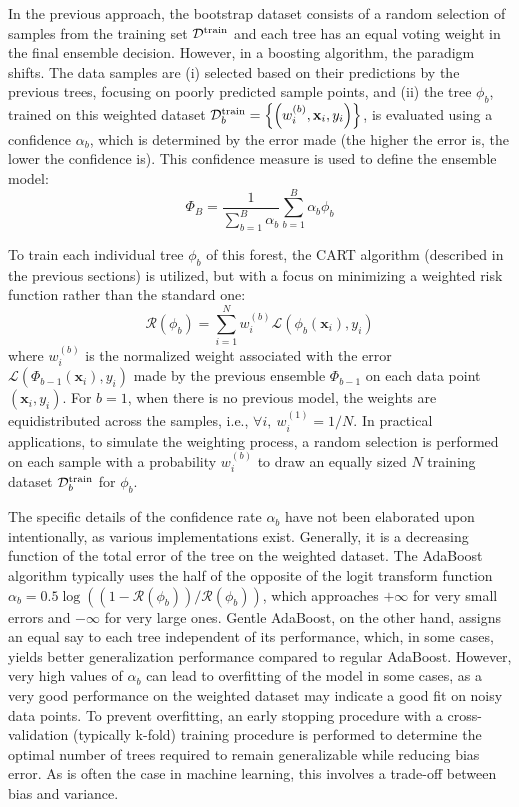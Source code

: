 \documentclass[main]{subfiles}
\begin{document}
In the previous approach, the bootstrap dataset consists of a random selection of samples from the training set $\mathcal{D}^{\text{train}}$ and each tree has an equal voting weight in the final ensemble decision. However, in a boosting algorithm,\autocite{drucker1997improving} the paradigm shifts. The data samples are (i) selected based on their predictions by the previous trees, focusing on poorly predicted sample points, and (ii) the tree $\phi_b$, trained on this weighted dataset $\mathcal{D}^{\text{train}}_b=\left\{\left(w_i^{(b)},\mathbf{x}_i,y_i\right)\right\}$, is evaluated using a confidence $\alpha_b$, which is determined by the error made (the higher the error is, the lower the confidence is). This confidence measure is used to define the ensemble model:
\begin{equation}
  \Phi_B = \frac{1}{\sum_{b=1}^{B} \alpha_b}\sum_{b=1}^{B} \alpha_b\phi_b
\end{equation}

To train each individual tree $\phi_b$ of this forest, the CART algorithm (described in the previous sections) is utilized, but with a focus on minimizing a weighted risk function rather than the standard one:
\begin{equation}
  \mathcal{R}(\phi_b) = \sum_{i=1}^N w_i^{(b)} \mathcal{L}\left(\phi_b(\mathbf{x}_i),y_i\right)
\end{equation}
where $w_i^{(b)}$ is the normalized weight associated with the error $\mathcal{L}\left(\Phi_{b-1}(\mathbf{x}_i),y_i\right)$ made by the previous ensemble $\Phi_{b-1}$ on each data point $\left(\mathbf{x}_i,y_i\right)$. For $b=1$, when there is no previous model, the weights are equidistributed across the samples, i.e., $\forall i,\ w_i^{(1)}=1/N$. In practical applications, to simulate the weighting process, a random selection is performed on each sample with a probability $w_i^{(b)}$ to draw an equally sized $N$ training dataset $\mathcal{D}^{\text{train}}_b$ for $\phi_b$. 

The specific details of the confidence rate $\alpha_b$ have not been elaborated upon intentionally, as various implementations exist. Generally, it is a decreasing function of the total error of the tree on the weighted dataset. The AdaBoost algorithm typically uses the half of the opposite of the logit transform function $\alpha_b=0.5\log\left((1-\mathcal{R}(\phi_b))/\mathcal{R}(\phi_b)\right)$, which approaches $+\infty$ for very small errors and $-\infty$ for very large ones.\autocite{Freund_1997,schapire2013explaining} Gentle AdaBoost, on the other hand, assigns an equal say to each tree independent of its performance, which, in some cases, yields better generalization performance compared to regular AdaBoost. However, very high values of $\alpha_b$ can lead to overfitting of the model in some cases, as a very good performance on the weighted dataset may indicate a good fit on noisy data points.\autocite{schapire1998improved} To prevent overfitting, an early stopping procedure with a cross-validation (typically k-fold) training procedure is performed to determine the optimal number of trees required to remain generalizable while reducing bias error. As is often the case in machine learning, this involves a trade-off between bias and variance.
\end{document}
